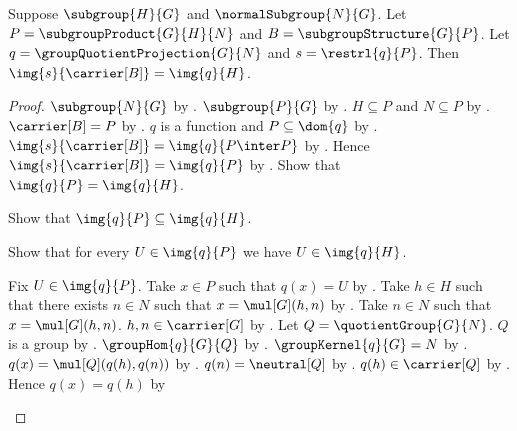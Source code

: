 \begin{theorem}\label{group_second_isomorphism_ambient_restriction_image}
    Suppose $\subgroup{H}{G}$ and $\normalSubgroup{N}{G}$.
    Let $P=\subgroupProduct{G}{H}{N}$ and
        $B=\subgroupStructure{G}{P}$.
    Let $q=\groupQuotientProjection{G}{N}$ and
        $s=\restrl{q}{P}$.
    Then $\img{s}{\carrier[B]}=\img{q}{H}$.
\end{theorem}
\begin{proof}
    $\subgroup{N}{G}$ by .
    $\subgroup{P}{G}$ by .
    $H\subseteq P$ and $N\subseteq P$ by
        .
    $\carrier[B]=P$ by .
    $q$ is a function and $P\subseteq\dom{q}$ by
        .
    $\img{s}{\carrier[B]}=\img{q}{P\inter P}$ by
        .
    Hence $\img{s}{\carrier[B]}=\img{q}{P}$ by
        .
    Show that $\img{q}{P}=\img{q}{H}$.
    \begin{subproof}
        Show that $\img{q}{P}\subseteq\img{q}{H}$.
        \begin{subproof}
            Show that for every $U\in\img{q}{P}$ we have
                $U\in\img{q}{H}$.
            \begin{subproof}
                Fix $U\in\img{q}{P}$.
                Take $x\in P$ such that $q(x)=U$ by
                    .
                Take $h\in H$ such that there exists $n\in N$ such that
                    $x=\mul[G](h,n)$ by
                    .
                Take $n\in N$ such that $x=\mul[G](h,n)$.
                $h,n\in\carrier[G]$ by
                    .
                Let $Q=\quotientGroup{G}{N}$.
                $Q$ is a group by .
                $\groupHom{q}{G}{Q}$ by
                    .
                $\groupKernel{q}{G}=N$ by
                    .
                $q(x)=\mul[Q](q(h),q(n))$ by
                    .
                $q(n)=\neutral[Q]$ by
                    .
                $q(h)\in\carrier[Q]$ by
                    .
                Hence $q(x)=q(h)$ by

\end{subproof}
\end{subproof}
\end{subproof}
\end{proof}
